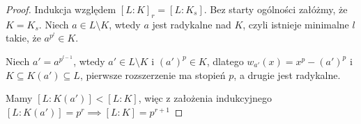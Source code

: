 \begin{proof}
Indukcja względem $[L:K]_r=[L:K_s]$. Bez starty ogólności załóżmy, że $K=K_s$. Niech $a\in L\setminus K$, wtedy $a$ jest radykalne nad $K$, czyli istnieje minimalne $l$ takie, że  $a^{p^l}\in K$.

Niech $a'=a^{p^{l-1}}$, wtedy $a'\in L\setminus K$ i $(a')^p\in K$, dlatego $w_{a'}(x)=x^p-(a')^p$ i $K\subseteq K(a')\subseteq L$, pierwsze rozszerzenie ma stopień $p$, a drugie jest radykalne.

Mamy $[L:K(a')]<[L:K]$, więc z założenia indukcyjnego $[L:K(a')]=p^r\implies [L:K]=p^{r+1}$
\end{proof}





















